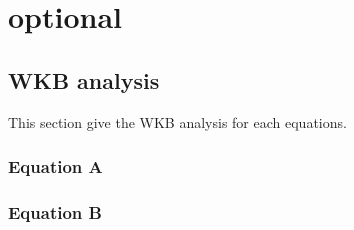 \documentclass[a4paper,12pt,twoside]{article}
\begin{document}
\newpage

\section{optional}
  \subsection{WKB analysis}\label{sec:WKB}
    This section give the WKB analysis for each equations.

    \subsubsection{Equation A}
      \lipsum[1-2] %


    \subsubsection{Equation B}
\end{document}
